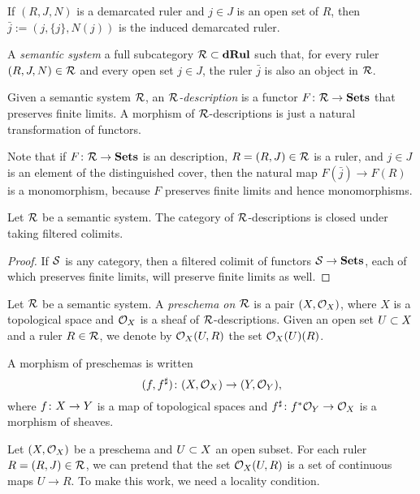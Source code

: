 \documentclass{amsart}
\def\dRul{{\bf dRul}}
\def\j{\bar{j}}
\begin{document}
If $(R,J,N)$ is a demarcated ruler and $j\in J$ is an open set of $R$, then $\j:=(j,\{j\},N(j))$ is the induced demarcated ruler.

\begin{definition}

A {\em semantic system} a full subcategory $\mcR\ss\dRul$ such that, for every ruler $(R,J,N)\in\mcR$ and every open set $j\in J$, the ruler $\j$ is also an object in $\mcR$.  

Given a semantic system $\mcR$, an {\em $\mcR$-description} is a functor $F\taking\mcR\to\Sets$ that preserves finite limits.  A morphism of $\mcR$-descriptions is just a natural transformation of functors.

\end{definition}

Note that if $F\taking\mcR\to\Sets$ is an description, $R=(R,J)\in\mcR$ is a ruler, and $j\in J$ is an element of the distinguished cover, then the natural map $F(\bar{j})\to F(R)$ is a monomorphism, because $F$ preserves finite limits and hence monomorphisms.

\begin{lemma}

Let $\mcR$ be a semantic system.  The category of $\mcR$-descriptions is closed under taking filtered colimits.

\end{lemma}

\begin{proof}

If $\mcS$ is any category, then a filtered colimit of functors $\mcS\to\Sets$, each of which preserves finite limits, will preserve finite limits as well.

\end{proof}

\begin{definition}

Let $\mcR$ be a semantic system.  A {\em preschema on $\mcR$} is a pair $(X,\mcO_X)$, where $X$ is a topological space and $\mcO_X$ is a sheaf of $\mcR$-descriptions.  Given an open set $U\ss X$ and a ruler $R\in\mcR$, we denote by $\mcO_X(U,R)$ the set $\mcO_X(U)(R)$.  

A morphism of preschemas is written $$(f,f^\sharp)\taking(X,\mcO_X)\to(Y,\mcO_Y),$$ where $f\taking X\to Y$ is a map of topological spaces and $f^\sharp\taking f^*\mcO_Y\to\mcO_X$ is a morphism of sheaves.

\end{definition}

Let $(X,\mcO_X)$ be a preschema and $U\ss X$ an open subset. For each ruler $R=(R,J)\in\mcR$, we can pretend that the set $\mcO_X(U,R)$ is a set of continuous maps $U\to R$.   To make this work, we need a locality condition.
\end{document}
